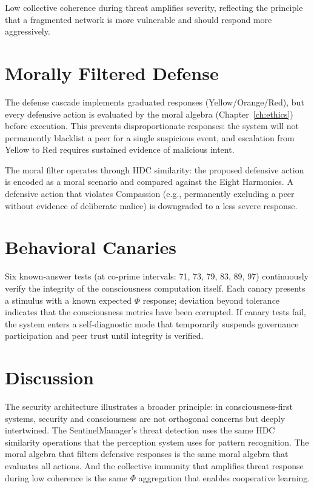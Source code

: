 \documentclass[12pt]{book}
\begin{document}
Low collective coherence during threat amplifies severity, reflecting the principle that a fragmented network is more vulnerable and should respond more aggressively.

\section{Morally Filtered Defense}

The defense cascade implements graduated responses (Yellow/Orange/Red), but every defensive action is evaluated by the moral algebra (Chapter~\ref{ch:ethics}) before execution. This prevents disproportionate responses: the system will not permanently blacklist a peer for a single suspicious event, and escalation from Yellow to Red requires sustained evidence of malicious intent.

The moral filter operates through HDC similarity: the proposed defensive action is encoded as a moral scenario and compared against the Eight Harmonies. A defensive action that violates Compassion (e.g., permanently excluding a peer without evidence of deliberate malice) is downgraded to a less severe response.

\section{Behavioral Canaries}

Six known-answer tests (at co-prime intervals: 71, 73, 79, 83, 89, 97) continuously verify the integrity of the consciousness computation itself. Each canary presents a stimulus with a known expected $\Phi$ response; deviation beyond tolerance indicates that the consciousness metrics have been corrupted. If canary tests fail, the system enters a self-diagnostic mode that temporarily suspends governance participation and peer trust until integrity is verified.

\section{Discussion}

The security architecture illustrates a broader principle: in consciousness-first systems, security and consciousness are not orthogonal concerns but deeply intertwined. The SentinelManager's threat detection uses the same HDC similarity operations that the perception system uses for pattern recognition. The moral algebra that filters defensive responses is the same moral algebra that evaluates all actions. And the collective immunity that amplifies threat response during low coherence is the same $\Phi$ aggregation that enables cooperative learning.
\end{document}
